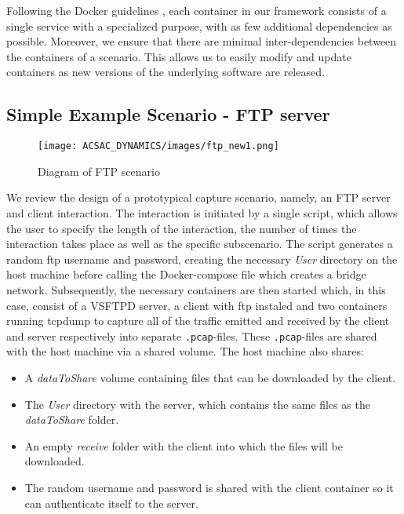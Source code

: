 \documentclass[sigconf]{acmart}
\begin{document}
Following the Docker guidelines \cite{bestpractise}, each container in our framework consists of a single service with a specialized purpose, with as few additional dependencies as possible. %
Moreover, we ensure that there are minimal inter-dependencies between the containers of a scenario. This allows us to easily modify and update containers as new versions of the underlying software are released.



 


\subsection{Simple Example Scenario - FTP server}
\begin{figure}%
\centering
\texttt{[image: ACSAC\_DYNAMICS/images/ftp\_new1.png]}
\caption{Diagram of FTP scenario}
\end{figure}

We review the design of a prototypical capture scenario, namely, an FTP server and client interaction. The interaction is initiated by a single script, which allows the user to specify the length of the interaction, the number of times the interaction takes place as well as the specific subscenario. The script generates a random ftp username and password, creating the necessary \textit{User} directory on the host machine before calling the Docker-compose file which creates a bridge network. Subsequently, the necessary containers are then started which, in this case, consist of a VSFTPD server, a client with ftp instaled and two containers running tcpdump to capture all of the traffic emitted and received by the client and server respectively into separate \texttt{.pcap}-files. These \texttt{.pcap}-files are shared with the host machine via a shared volume. The host machine also shares:
 
\begin{itemize}
\item A \textit{dataToShare} volume containing files that can be downloaded by the client.
\item The \textit{User} directory with the server, which contains the same files as the \textit{dataToShare} folder.
\item An empty \textit{receive} folder with the client into which the files will be downloaded.
\item The random username and password is shared with the client container so it can authenticate itself to the server.
\end{itemize}
 
\end{document}
